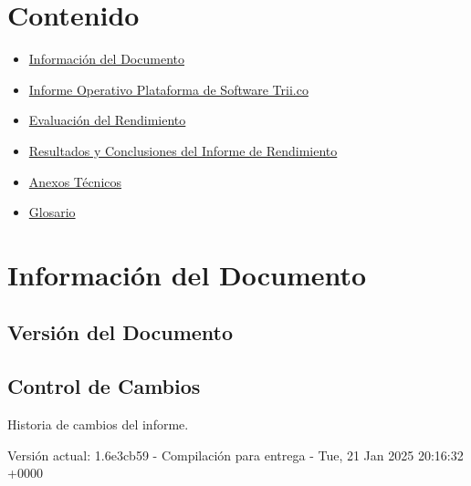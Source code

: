 \documentclass[
  paper=a4,
  ,captions=tableheading
]{scrartcl}
\providecommand{\tightlist}{%
  \setlength{\itemsep}{0pt}\setlength{\parskip}{0pt}}
\renewenvironment{quote}{\begin{customblockquote}\list{}{\rightmargin=0em\leftmargin=0em}%
\item\relax\color{blockquote-text}\ignorespaces}{\unskip\unskip\endlist\end{customblockquote}}
\begin{document}



\section{Contenido}\label{sec:contenido}

\begin{itemize}
\tightlist
\item
  \hyperref[informaciuxf3n-del-documento]{Información del Documento}
\item
  \hyperref[informe-operativo-plataforma-de-software-trii.co]{Informe
  Operativo Plataforma de Software Trii.co}
\item
  \hyperref[evaluaciuxf3n-del-rendimiento]{Evaluación del Rendimiento}
\item
  \hyperref[resultados-y-conclusiones-del-informe-de-rendimiento]{Resultados
  y Conclusiones del Informe de Rendimiento}
\item
  \hyperref[anexos-tuxe9cnicos]{Anexos Técnicos}
\item
  \hyperref[glosario]{Glosario}
\end{itemize}

\newpage

\section{Información del
Documento}\label{sec:informaciuxf3n-del-documento}

\subsection{Versión del Documento}\label{sec:versiuxf3n-del-documento}

\begin{quote}
\end{quote}

\subsection{Control de Cambios}\label{sec:control-de-cambios}

Historia de cambios del informe.

Versión actual: 1.6e3cb59 - Compilación para entrega - Tue, 21 Jan 2025
20:16:32 +0000
\end{document}

